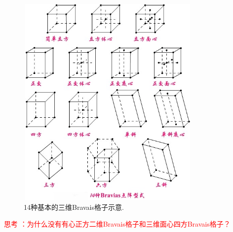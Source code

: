 \begin{figure}[h!]
\centering
\vspace*{-0.05in}
\includegraphics[height=4.15in,width=3.55in,viewport=0 25 487 581,clip]{Figures/Bravais_Lattice-3D.jpg}
\caption{\small \textrm{14种基本的三维Bravais格子示意.}}%
\label{Fig:Lattice_Type-3D}
\end{figure}

\textcolor{red}{\heiti 思考 ：为什么没有有心正方二维Bravais格子和三维面心四方Bravais格子？}

